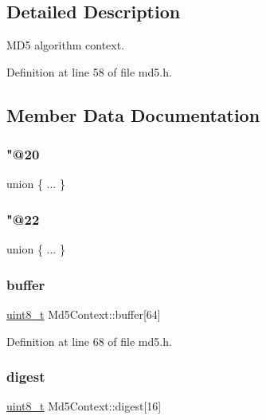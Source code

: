 \subsection{Detailed Description}
M\+D5 algorithm context. 

Definition at line 58 of file md5.\+h.



\subsection{Member Data Documentation}
\mbox{\label{structMd5Context_a726958de8c21ed819434cd02e620e07b}} 
\subsubsection{\texorpdfstring{"@20}{@20}}
{\footnotesize\ttfamily union \{ ... \} }

\mbox{\label{structMd5Context_aaad8004c62d1aa770e4a246f6ecb83d4}} 
\subsubsection{\texorpdfstring{"@22}{@22}}
{\footnotesize\ttfamily union \{ ... \} }

\mbox{\label{structMd5Context_aef6cb68a2c65dcfc8274b356263db671}} 
\subsubsection{\texorpdfstring{buffer}{buffer}}
{\footnotesize\ttfamily \hyperlink{stdint_8h_aba7bc1797add20fe3efdf37ced1182c5}{uint8\+\_\+t} Md5\+Context\+::buffer\mbox{[}64\mbox{]}}



Definition at line 68 of file md5.\+h.

\mbox{\label{structMd5Context_a2f29146370d91b5b9b9a6bd6f9b8f79b}} 
\subsubsection{\texorpdfstring{digest}{digest}}
{\footnotesize\ttfamily \hyperlink{stdint_8h_aba7bc1797add20fe3efdf37ced1182c5}{uint8\+\_\+t} Md5\+Context\+::digest\mbox{[}16\mbox{]}}



